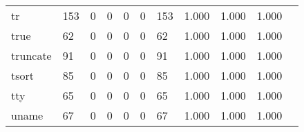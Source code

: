 \begin{longtable}{lp{1.2cm}p{1.2cm}p{1.2cm}p{1.2cm}p{1.2cm}p{1.2cm}p{1.2cm}p{1.2cm}p{1.2cm}p{1.2cm}}
tr        &                                   153 &                                                  0 &                                                  0 &                                                  0 &                                                  0 &                                                153 &                                              1.000 &                                              1.000 &                                              1.000 \\
true      &                                    62 &                                                  0 &                                                  0 &                                                  0 &                                                  0 &                                                 62 &                                              1.000 &                                              1.000 &                                              1.000 \\
truncate  &                                    91 &                                                  0 &                                                  0 &                                                  0 &                                                  0 &                                                 91 &                                              1.000 &                                              1.000 &                                              1.000 \\
tsort     &                                    85 &                                                  0 &                                                  0 &                                                  0 &                                                  0 &                                                 85 &                                              1.000 &                                              1.000 &                                              1.000 \\
tty       &                                    65 &                                                  0 &                                                  0 &                                                  0 &                                                  0 &                                                 65 &                                              1.000 &                                              1.000 &                                              1.000 \\
uname     &                                    67 &                                                  0 &                                                  0 &                                                  0 &                                                  0 &                                                 67 &                                              1.000 &                                              1.000 &                                              1.000 \\

\end{longtable}
